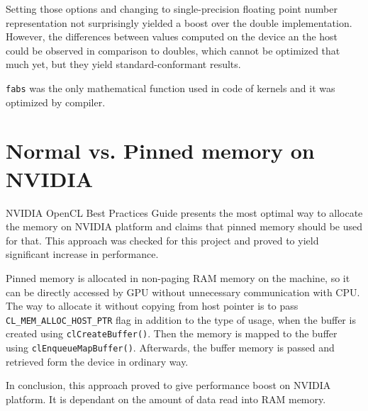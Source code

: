 Setting those options and changing to single-precision floating point number representation not surprisingly yielded a boost over the double implementation. However, the differences between values computed on the device an the host could be observed in comparison to doubles, which cannot be optimized that much yet, but they yield standard-conformant results.

\texttt{fabs} was the only mathematical function used in code of kernels and it was optimized by compiler.

\section{Normal vs. Pinned memory on NVIDIA}
NVIDIA OpenCL Best Practices Guide\cite{nvidia2011openclbest} presents the most optimal way to allocate the memory on NVIDIA platform and claims that pinned memory should be used for that. This approach was checked for this project and proved to yield significant increase in performance. 


Pinned memory is allocated in non-paging RAM memory on the machine, so it can be directly accessed by GPU without unnecessary communication with CPU.  The way to allocate it without copying from host pointer is to pass \texttt{CL\_MEM\_ALLOC\_HOST\_PTR} flag in addition to the type of usage, when the buffer is created using \texttt{clCreateBuffer()}. Then the memory is mapped to the buffer using \texttt{clEnqueueMapBuffer()}. Afterwards, the buffer memory is passed and retrieved form the device in ordinary way.

In conclusion, this approach proved to give performance boost on NVIDIA platform. It is dependant on the amount of data read into RAM memory.

